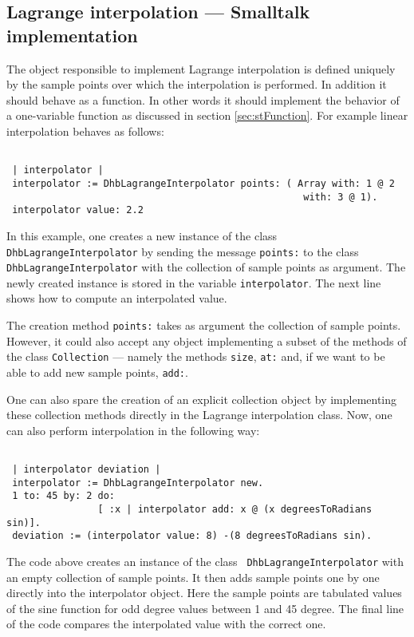 \documentclass[twoside]{book}
\begin{document}
\subsection{Lagrange interpolation --- Smalltalk implementation}
\label{sec:slagrange} The object
responsible to implement Lagrange interpolation is defined
uniquely by the sample points over which the interpolation is
performed. In addition it should behave as a function. In other
words it should implement the behavior of a one-variable function
as discussed in section \ref{sec:stFunction}. For example linear
interpolation behaves as follows:
\begin{codeExample}\label{ex:lagrangeS1}
\begin{verbatim}

 | interpolator |
 interpolator := DhbLagrangeInterpolator points: ( Array with: 1 @ 2
                                                    with: 3 @ 1).
 interpolator value: 2.2
\end{verbatim}
\end{codeExample}
In this example, one creates a new instance of the class {\tt
DhbLagrangeInterpolator} by sending the message {\tt points:} to
the class {\tt DhbLagrangeInterpolator} with the collection of
sample points as argument. The newly created instance is stored in
the variable {\tt interpolator}. The next line shows how to
compute an interpolated value.

The creation method {\tt points:} takes as argument the collection
of sample points. However, it could also accept any object
implementing a subset of the methods of the class {\tt Collection}
--- namely the methods {\tt size}, {\tt at:} and, if we want to be
able to add new sample points, {\tt add:}.

One can also spare the creation of an explicit collection object
by implementing these collection methods directly in the Lagrange
interpolation class. Now, one can also perform interpolation in
the following way:
\begin{codeExample}\label{ex:lagrangeS2}
\begin{verbatim}

 | interpolator deviation |
 interpolator := DhbLagrangeInterpolator new.
 1 to: 45 by: 2 do:
                [ :x | interpolator add: x @ (x degreesToRadians sin)].
 deviation := (interpolator value: 8) -(8 degreesToRadians sin).
\end{verbatim}
\end{codeExample}
The code above creates an instance of the class {\tt
DhbLagrangeInterpolator} with an empty collection of sample
points. It then adds sample points one by one directly into the
interpolator object. Here the sample points are tabulated values
of the sine function for odd degree values between 1 and 45
degree. The final line of the code compares the interpolated value
with the correct one.
\end{document}
